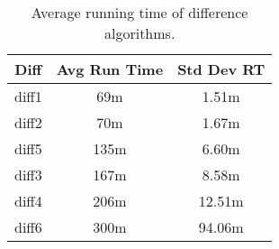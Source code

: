\begin{table}[tbph]
\begin{center}
\begin{tabular}{|c||c|c|}
\hline
Diff & Avg Run Time & Std Dev RT  \\
\hline
\hline
diff1 & 69m & 1.51m \\
diff2 & 70m & 1.67m \\
diff5 & 135m & 6.60m \\
diff3 & 167m & 8.58m \\
diff4 & 206m & 12.51m \\
diff6 & 300m & 94.06m \\
\hline
\end{tabular}
\end{center}
\caption{Average running time of difference algorithms.}
\label{tab:difftiming}
\end{table}
